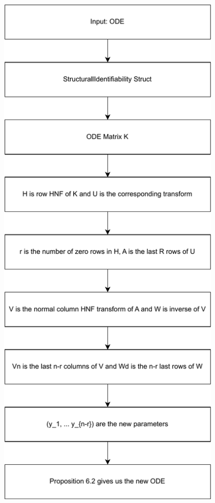 \documentclass[oneside, a4paper, onecolumn, 11pt]{article}
\begin{document}
\begin{figure}[H]
    \centering
    \includegraphics{images/Algo.pdf}
\end{figure}
\end{document}
